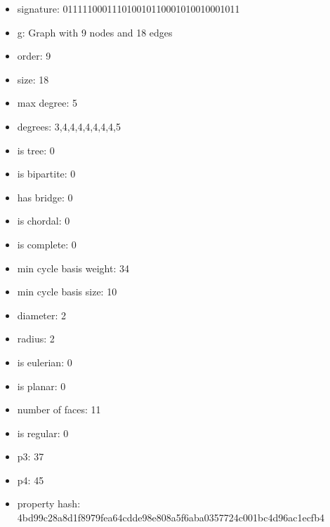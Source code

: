 \newpage
\begin{figure}
\end{figure}
\begin{itemize}
\item signature: 011111000111010010110001010010001011
\item g: Graph with 9 nodes and 18 edges
\item order: 9
\item size: 18
\item max degree: 5
\item degrees: 3,4,4,4,4,4,4,4,5
\item is tree: 0
\item is bipartite: 0
\item has bridge: 0
\item is chordal: 0
\item is complete: 0
\item min cycle basis weight: 34
\item min cycle basis size: 10
\item diameter: 2
\item radius: 2
\item is eulerian: 0
\item is planar: 0
\item number of faces: 11
\item is regular: 0
\item p3: 37
\item p4: 45
\item property hash: 4bd99c28a8d1f8979fea64cdde98e808a5f6aba0357724c001bc4d96ac1ecfb4
\end{itemize}
